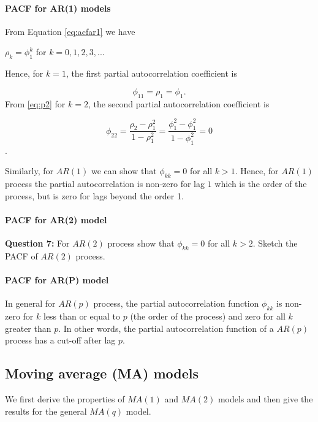 \documentclass[]{book}
\let\oldparagraph\paragraph
\renewcommand{\paragraph}[1]{\oldparagraph{#1}\mbox{}}
\begin{document}
\hypertarget{pacf-for-ar1-models}{%
\paragraph{PACF for AR(1) models}\label{pacf-for-ar1-models}}

From Equation \eqref{eq:acfar1} we have

\(\rho_k=\phi_1^k\) for \(k=0, 1, 2, 3,...\)

Hence, for \(k=1\), the first partial autocorrelation coefficient is

\[\phi_{11}=\rho_1=\phi_1.\]
From \eqref{eq:p2} for \(k=2\), the second partial autocorrelation coefficient is

\[\phi_{22}=\frac{\rho_2-\rho_1^2}{1-\rho_1^2}=\frac{\phi_1^2-\phi_1^2}{1-\phi_1^2} = 0\].

Similarly, for \(AR(1)\) we can show that \(\phi_{kk}=0\) for all \(k > 1\). Hence, for \(AR(1)\) process the partial autocorrelation is non-zero for lag \(1\) which is the order of the process, but is zero for lags beyond the order 1.

\hypertarget{pacf-for-ar2-model}{%
\paragraph{PACF for AR(2) model}\label{pacf-for-ar2-model}}

\textbf{Question 7:} For \(AR(2)\) process show that \(\phi_{kk}=0\) for all \(k>2\). Sketch the PACF of \(AR(2)\) process.

\hypertarget{pacf-for-arp-model}{%
\paragraph{PACF for AR(P) model}\label{pacf-for-arp-model}}

In general for \(AR(p)\) process, the partial autocorrelation function \(\phi_{kk}\) is non-zero for \(k\) less than or equal to \(p\) (the order of the process) and zero for all \(k\) greater than \(p\). In other words, the partial autocorrelation function of a \(AR(p)\) process has a cut-off after lag \(p\).

\hypertarget{moving-average-ma-models-1}{%
\subsection{Moving average (MA) models}\label{moving-average-ma-models-1}}

We first derive the properties of \(MA(1)\) and \(MA(2)\) models and then give the results for the general \(MA(q)\) model.
\end{document}

